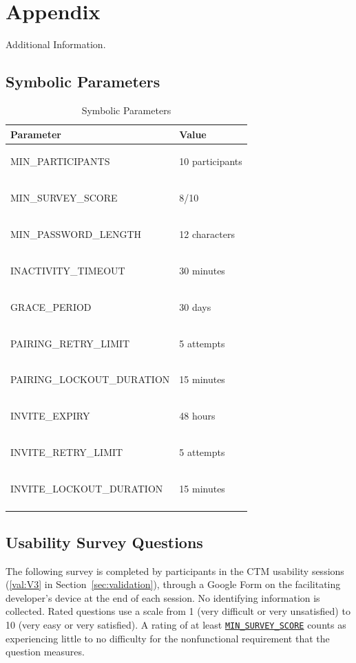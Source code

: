 \documentclass[12pt, titlepage]{article}
\newcounter{validation}
\newcommand{\valref}[1]{\hyperref[val:V#1]{\ref*{val:V#1}}}
\newcommand{\paramref}[2]{\hyperlink{param:#1}{\texttt{#2}}}
\begin{document}


\newpage

\section{Appendix}

Additional Information.

\subsection{Symbolic Parameters}

\begin{longtable}{p{} p{}}
\toprule
Parameter & Value\\
\midrule
\hypertarget{param:min-participants}{MIN\_PARTICIPANTS} & 10 participants\\
\hypertarget{param:min-survey-score}{MIN\_SURVEY\_SCORE} & 8/10\\
\hypertarget{param:min-password-length}{MIN\_PASSWORD\_LENGTH} & 12 characters\\
\hypertarget{param:inactivity-timeout}{INACTIVITY\_TIMEOUT} & 30 minutes\\
\hypertarget{param:grace-period}{GRACE\_PERIOD} & 30 days\\
\hypertarget{param:pairing-retry-limit}{PAIRING\_RETRY\_LIMIT} & 5 attempts\\
\hypertarget{param:pairing-lockout-duration}{PAIRING\_LOCKOUT\_DURATION} & 15 minutes\\
\hypertarget{param:invite-expiry}{INVITE\_EXPIRY} & 48 hours\\
\hypertarget{param:invite-retry-limit}{INVITE\_RETRY\_LIMIT} & 5 attempts\\
\hypertarget{param:invite-lockout-duration}{INVITE\_LOCKOUT\_DURATION} & 15 minutes\\
\bottomrule
\caption{Symbolic Parameters} \label{tab:SymbolicParameters}
\end{longtable}

\subsection{Usability Survey Questions}

The following survey is completed by participants in the CTM usability sessions (\valref{3} in Section~\ref{sec:validation}), through a Google Form on the facilitating developer's device at the end of each session. No identifying information is collected. Rated questions use a scale from 1 (very difficult or very unsatisfied) to 10 (very easy or very satisfied). A rating of at least \paramref{min-survey-score}{MIN\_SURVEY\_SCORE} counts as experiencing little to no difficulty for the nonfunctional requirement that the question measures.
\end{document}
